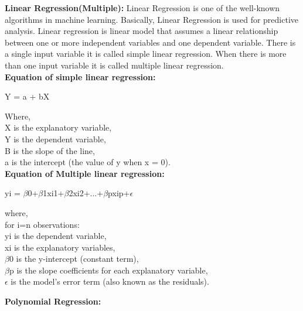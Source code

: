 \documentclass[conference]{IEEEtran}[10]
\begin{document}
\textbf{Linear Regression(Multiple):}
Linear Regression is one of the well-known algorithms in machine learning. Basically, Linear Regression is used for predictive analysis. Linear regression is linear model that assumes a linear relationship between one or more independent variables and one dependent variable. There is a single input variable it is called simple linear regression. When there is more than one input variable it is called multiple linear regression.
\\\textbf{Equation of simple linear regression:}
\begin{center}
{\large Y = a + bX}
\end{center}
Where,
\\X is the explanatory variable,
\\Y is the dependent variable, 
\\B is the slope of the line,
\\a is the intercept (the value of y when x = 0).
\\\textbf{Equation of Multiple linear regression:}
\begin{center}
{\large yi = $\beta$0+$\beta$1xi1+$\beta$2xi2+...+$\beta$pxip+$\epsilon$}
\end{center}
where,
\\for i=n observations:
\\yi is the dependent variable,
\\xi is the explanatory variables,
\\$\beta$0 is the y-intercept (constant term),
\\$\beta$p  is the slope coefficients for each explanatory variable,
\\$\epsilon$ is the model’s error term (also known as the residuals).



\textbf{Polynomial Regression:}
\end{document}
